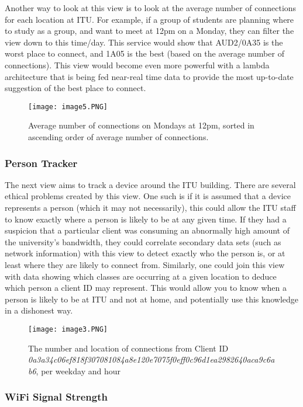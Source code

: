 \documentclass[format=acmsmall, review=false, screen=true]{acmart}
\begin{document}
Another way to look at this view is to look at the average number of connections for each location at ITU. For example, if a group of students are planning where to study as a group, and want to meet at 12pm on a Monday, they can filter the view down to this time/day. This service would show that AUD2/0A35 is the worst place to connect, and 1A05 is the best (based on the average number of connections). This view would become even more powerful with a lambda architecture that is being fed near-real time data to provide the most up-to-date suggestion of the best place to connect.

\begin{figure}[H]
  \texttt{[image: image5.PNG]}
  \caption{Average number of connections on Mondays at 12pm, sorted in ascending order of average number of connections.}
  \label{fig:main-diagram}
\end{figure}

\subsubsection{Person Tracker}

The next view aims to track a device around the ITU building. There are several ethical problems created by this view. One such is if it is assumed that a device represents a person (which it may not necessarily), this could allow the ITU staff to know exactly where a person is likely to be at any given time. If they had a suspicion that a particular client was consuming an abnormally high amount of the university’s bandwidth, they could correlate secondary data sets (such as network information) with this view to detect exactly who the person is, or at least where they are likely to connect from. Similarly, one could join this view with data showing which classes are occurring at a given location to deduce which person a client ID may represent. This would allow you to know when a person is likely to be at ITU and not at home, and potentially use this knowledge in a dishonest way.

\begin{figure}[H]
  \texttt{[image: image3.PNG]}
  \caption{The number and location of connections from Client ID \textit{0a3a34c06ef818f307081084a8e120e7075f0eff0c96d1ea2982640aca9c6ab6}, per weekday and hour}
  \label{fig:main-diagram}
\end{figure}

\subsubsection{WiFi Signal Strength}
\end{document}
